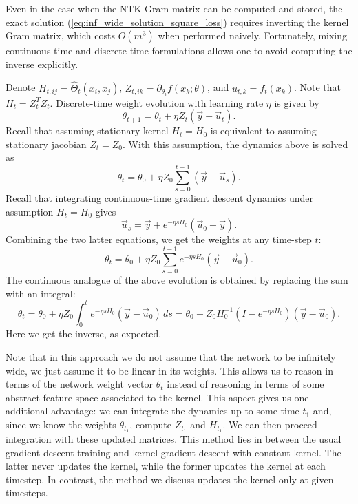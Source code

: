 \documentclass{article}
\begin{document}
    Even in the case when the NTK Gram matrix can be computed and stored, the exact solution (\ref{eq:inf_wide_solution_square_loss}) requires inverting the kernel Gram matrix, which costs $O(m^3)$ when performed naively.
    Fortunately, mixing continuous-time and discrete-time formulations allows one to avoid computing the inverse explicitly.
    
    Denote $H_{t,ij} = \hat\Theta_t(x_i,x_j)$, $Z_{t,ik} = \partial_{\theta_i} f(x_k;\theta)$, and $u_{t,k} = f_t(x_k)$.
    Note that $H_t = Z_t^T Z_t$.
    Discrete-time weight evolution with learning rate $\eta$ is given by
    \begin{equation}
        \theta_{t+1}
        = \theta_t + \eta Z_t (\vec y - \vec u_t).
    \end{equation}
    Recall that assuming stationary kernel $H_t = H_0$ is equivalent to assuming stationary jacobian $Z_t = Z_0$.
    With this assumption, the dynamics above is solved as
    \begin{equation}
        \theta_t
        = \theta_0 + \eta Z_0 \sum_{s=0}^{t-1} (\vec y - \vec u_s).
    \end{equation}
    Recall that integrating continuous-time gradient descent dynamics under assumption $H_t = H_0$ gives
    \begin{equation}
        \vec u_s
        = \vec y + e^{-\eta s H_0} (\vec u_0 - \vec y).
    \end{equation}
    Combining the two latter equations, we get the weights at any time-step $t$:
    \begin{equation}
        \theta_t
        = \theta_0 + \eta Z_0 \sum_{s=0}^{t-1} e^{-\eta s H_0} (\vec y - \vec u_0).
    \end{equation}
    The continuous analogue of the above evolution is obtained by replacing the sum with an integral:
    \begin{equation}
        \theta_t
        = \theta_0 + \eta Z_0 \int_0^t e^{-\eta s H_0} (\vec y - \vec u_0) \, ds
        = \theta_0 + Z_0 H_0^{-1} \left(I - e^{-\eta s H_0}\right) (\vec y - \vec u_0).
    \end{equation}
    Here we get the inverse, as expected.

    Note that in this approach we do not assume that the network to be infinitely wide, we just assume it to be linear in its weights. 
    This allows us to reason in terms of the network weight vector $\theta_t$ instead of reasoning in terms of some abstract feature space associated to the kernel.
    This aspect gives us one additional advantage: we can integrate the dynamics up to some time $t_1$ and, since we know the weights $\theta_{t_1}$, compute $Z_{t_1}$ and $H_{t_1}$.
    We can then proceed integration with these updated matrices.
    This method lies in between the usual gradient descent training and kernel gradient descent with constant kernel.
    The latter never updates the kernel, while the former updates the kernel at each timestep.
    In contrast, the method we discuss updates the kernel only at given timesteps.
    
\end{document}
